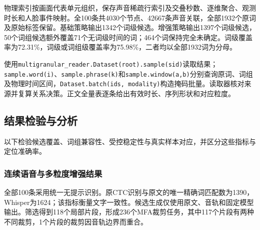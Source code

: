 物理索引按画面代表单元组织，保存声音稀疏行索引及交叠秒数、逐维聚合、观测时长和人脸事件映射。全100条共4030个节点、42667条声音关联，全部1932个原词及原始标签保留。基础策略输出1342个词级候选。增强策略输出1397个词级候选，50个词组候选额外覆盖71个无词级时间的词；464个词保持完全未确定。词级覆盖率为72.31\%，词级或词组级覆盖率为75.98\%，二者均以全部1932词为分母。

使用\texttt{multigra\allowbreak{}nular\_\allowbreak{}reader.Dataset(root).sample(sid)}读取结果；\texttt{sample.word(i)}、\texttt{sample.phrase(k)}和\texttt{sample.window(a,b)}分别查询原词、词组及物理时间区间，\texttt{Dataset.batch(ids, modality\allowbreak{})}构造掩码批量。读取器核对来源并复算关系决策。正文全量表逐条给出有效时长、序列形状和对应粒度。

\hypertarget{q1-ux7ed3ux679cux68c0ux9a8cux4e0eux5206ux6790}{%
\subsection{结果检验与分析}\label{q1-ux7ed3ux679cux68c0ux9a8cux4e0eux5206ux6790}}

以下检验候选覆盖、词组兼容性、受控稳定性与真实样本对应，并区分这些指标与定位准确率。

\hypertarget{q1-ux8fdeux7eedux8bedux97f3ux4e0eux591aux7c92ux5ea6ux589eux5f3aux7ed3ux679c}{%
\subsubsection{连续语音与多粒度增强结果}\label{q1-ux8fdeux7eedux8bedux97f3ux4e0eux591aux7c92ux5ea6ux589eux5f3aux7ed3ux679c}}

全部100条采用统一无提示识别。原CTC识别与原文的唯一精确词匹配数为1390，Whisper为1624；该指标衡量文字一致性。候选生成仅使用原文、音轨和固定模型输出。筛选得到118个局部片段，形成236个MFA裁剪任务，其中117个片段有两种不同裁剪，1个片段的裁剪因音轨边界而重合。

